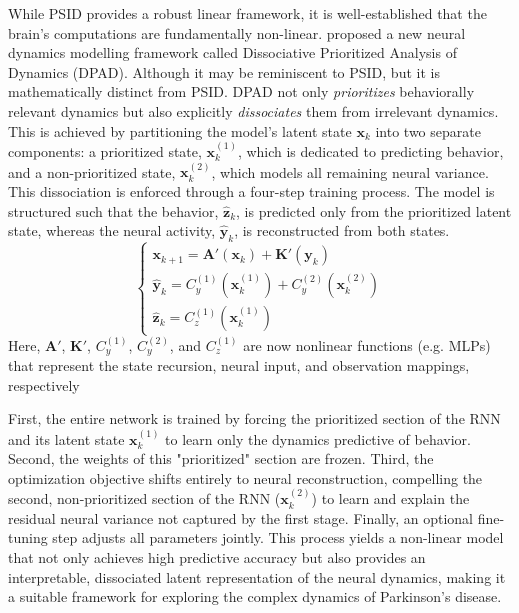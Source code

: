 \documentclass[12pt, a4paper]{article}
\begin{document}
While PSID provides a robust linear framework, it is well-established that the brain's computations are fundamentally non-linear. \textcite{saniDissociativePrioritizedModeling2024} proposed a new neural dynamics modelling framework called Dissociative Prioritized Analysis of Dynamics (DPAD). Although it may be reminiscent to PSID, but it is mathematically distinct from PSID. DPAD not only \textit{prioritizes} behaviorally relevant dynamics but also explicitly \textit{dissociates} them from irrelevant dynamics. This is achieved by partitioning the model's latent state $\mathbf{x}_k$ into two separate components: a prioritized state, $\mathbf{x}_k^{(1)}$, which is dedicated to predicting behavior, and a non-prioritized state, $\mathbf{x}_k^{(2)}$, which models all remaining neural variance.
This dissociation is enforced through a four-step training process. The model is structured such that the behavior, $\hat{\mathbf{z}}_k$, is predicted only from the prioritized latent state, whereas the neural activity, $\hat{\mathbf{y}}_k$, is reconstructed from both states.
$$
    \begin{cases}
        \mathbf{x}_{k+1} = \mathbf{A}'(\mathbf{x}_k) + \mathbf{K}'(\mathbf{y}_k)           \\
        \hat{\mathbf{y}}_k = C_y^{(1)}(\mathbf{x}_k^{(1)}) + C_y^{(2)}(\mathbf{x}_k^{(2)}) \\
        \hat{\mathbf{z}}_k = C_z^{(1)}(\mathbf{x}_k^{(1)})
    \end{cases}
$$
Here, $\mathbf{A}'$, $\mathbf{K}'$, $C_y^{(1)}$, $C_y^{(2)}$, and $C_z^{(1)}$ are now nonlinear functions (e.g. MLPs) that represent the state recursion, neural input, and observation mappings, respectively

First, the entire network is trained by forcing the prioritized section of the RNN and its latent state $\mathbf{x}_k^{(1)}$ to learn only the dynamics predictive of behavior. Second, the weights of this "prioritized" section are frozen. Third, the optimization objective shifts entirely to neural reconstruction, compelling the second, non-prioritized section of the RNN ($\mathbf{x}_k^{(2)}$) to learn and explain the residual neural variance not captured by the first stage. Finally, an optional fine-tuning step adjusts all parameters jointly. This process yields a non-linear model that not only achieves high predictive accuracy but also provides an interpretable, dissociated latent representation of the neural dynamics, making it a suitable framework for exploring the complex dynamics of Parkinson's disease.
\end{document}
